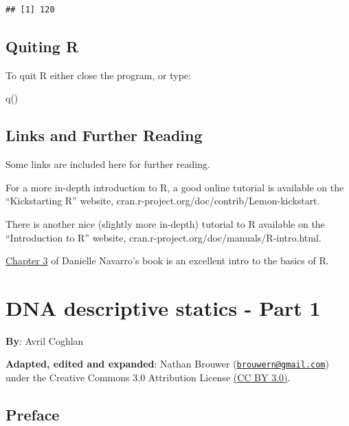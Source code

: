 \documentclass[
]{book}
\newenvironment{Shaded}{\begin{snugshade}}{\end{snugshade}}
\newcommand{\FunctionTok}[1]{\textcolor[rgb]{0.00,0.00,0.00}{#1}}
\newcommand{\NormalTok}[1]{#1}
\begin{document}
\begin{verbatim}
## [1] 120
\end{verbatim}

\hypertarget{quiting-r}{%
\section{Quiting R}\label{quiting-r}}

To quit R either close the program, or type:

\begin{Shaded}
\begin{Highlighting}[]
\FunctionTok{q}\NormalTok{()}
\end{Highlighting}
\end{Shaded}

\hypertarget{links-and-further-reading}{%
\section{Links and Further Reading}\label{links-and-further-reading}}

Some links are included here for further reading.

For a more in-depth introduction to R, a good online tutorial is available on the ``Kickstarting R'' website, cran.r-project.org/doc/contrib/Lemon-kickstart.

There is another nice (slightly more in-depth) tutorial to R available on the ``Introduction to R'' website, cran.r-project.org/doc/manuals/R-intro.html.

\href{https://learningstatisticswithr.com/book/introR.html}{Chapter 3} of Danielle Navarro's book is an excellent intro to the basics of R.

\hypertarget{dna-descriptive-statics---part-1}{%
\chapter{DNA descriptive statics - Part 1}\label{dna-descriptive-statics---part-1}}

\textbf{By}: Avril Coghlan

\textbf{Adapted, edited and expanded}: Nathan Brouwer (\href{mailto:brouwern@gmail.com}{\nolinkurl{brouwern@gmail.com}}) under the Creative Commons 3.0 Attribution License \href{https://creativecommons.org/licenses/by/3.0/}{(CC BY 3.0)}.

\hypertarget{preface-1}{%
\section{Preface}\label{preface-1}}
\end{document}
